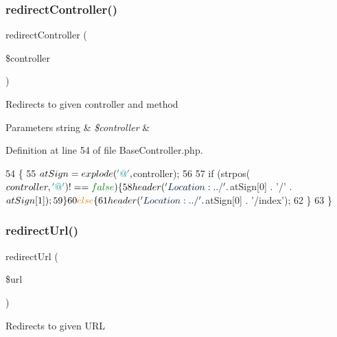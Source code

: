 \subsubsection{\texorpdfstring{redirect\+Controller()}{redirectController()}}
{\footnotesize\ttfamily redirect\+Controller (\begin{DoxyParamCaption}\item[{}]{\$controller }\end{DoxyParamCaption})\hspace{0.3cm}{\ttfamily [protected]}}

Redirects to given controller and method


\begin{DoxyParams}[1]{Parameters}
string & {\em \$controller} & \\
\hline
\end{DoxyParams}


Definition at line 54 of file Base\+Controller.\+php.


\begin{DoxyCode}
54                                                        \{
55         $atSign = explode(\textcolor{charliteral}{'@'}, $controller);
56 
57         \textcolor{keywordflow}{if} (strpos($controller, \textcolor{charliteral}{'@'}) !== \textcolor{keyword}{false}) \{
58             header(\textcolor{stringliteral}{'Location:../'} . $atSign[0] . \textcolor{charliteral}{'/'} . $atSign[1]);
59         \}
60         \textcolor{keywordflow}{else} \{
61             header(\textcolor{stringliteral}{'Location:../'} . $atSign[0] . \textcolor{stringliteral}{'/index'});
62         \}
63     \}
\end{DoxyCode}
\hypertarget{class_base_controller_a9f95c7503770ed9c974005b363ec3d00}{}\label{class_base_controller_a9f95c7503770ed9c974005b363ec3d00} 
\subsubsection{\texorpdfstring{redirect\+Url()}{redirectUrl()}}
{\footnotesize\ttfamily redirect\+Url (\begin{DoxyParamCaption}\item[{}]{\$url }\end{DoxyParamCaption})\hspace{0.3cm}{\ttfamily [protected]}}

Redirects to given U\+RL



